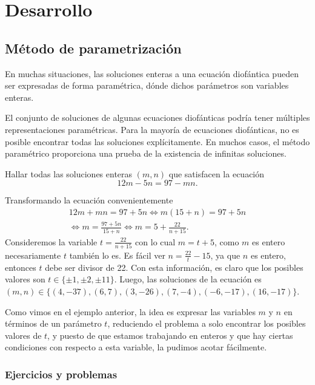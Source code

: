 \section{Desarrollo}

\subsection{Método de parametrización}

En muchas situaciones, las soluciones enteras a una ecuación diofántica pueden ser expresadas de forma paramétrica, dónde dichos parámetros son variables enteras.

El conjunto de soluciones de algunas ecuaciones diofánticas podría tener múltiples representaciones paramétricas.
Para la mayoría de ecuaciones diofánticas, no es posible encontrar todas las soluciones explícitamente.
En muchos casos, el método paramétrico proporciona una prueba de la existencia de infinitas soluciones.

\begin{example}
    Hallar todas las soluciones enteras $(m,n)$ que satisfacen la ecuación
    \[
        12m - 5n = 97 - mn.
    \]
\end{example}
\begin{solution}
    Transformando la ecuación convenientemente
    \begin{multline*}
        12m + mn = 97 + 5n \iff
        m(15 + n) = 97 + 5n\\ \iff
        m = \frac{97 + 5n}{15 + n} \iff
        m = 5 + \frac{22}{n + 15}.
    \end{multline*}
    Consideremos la variable $t = \frac{22}{n + 15}$ con lo cual $m = t + 5$, como $m$ es entero necesariamente $t$
    también lo es.
    Es fácil ver $n = \frac{22}{t} - 15$, ya que $n$ es entero, entonces $t$ debe ser divisor de 22.
    Con esta información, es claro que los posibles valores son $t \in \{\pm 1, \pm 2, \pm 11 \}$.
    Luego, las soluciones de la ecuación es $(m,n) \in \{(4, -37), (6, 7), (3, -26), (7, -4), (-6, -17), (16, -17)\}$.
\end{solution}

Como vimos en el ejemplo anterior, la idea es expresar las variables $m$ y $n$ en términos de un parámetro $t$,
reduciendo el problema a solo encontrar los posibles valores de $t$, y puesto de que estamos trabajando en enteros
y que hay ciertas condiciones con respecto a esta variable, la pudimos acotar fácilmente.

\subsubsection{Ejercicios y problemas}

